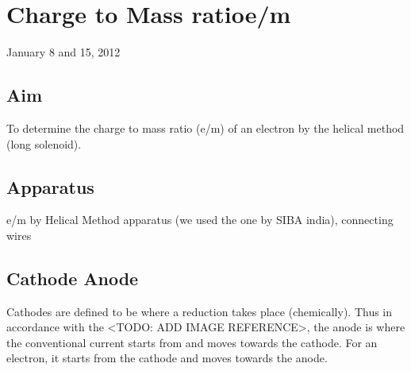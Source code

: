 \chapter{Charge to Mass ratioe/m}
\begin{flushright}
January 8 and 15, 2012
\end{flushright}
\section{Aim}
	To determine the charge to mass ratio (e/m) of an electron by the helical method (long solenoid).
\section{Apparatus}
	e/m by Helical Method apparatus (we used the one by SIBA india), connecting wires

\section{Cathode Anode}
	Cathodes are defined to be where a reduction takes place (chemically). Thus in accordance with the <TODO: ADD IMAGE REFERENCE>, the anode is where the conventional current starts from and moves towards the cathode. For an electron, it starts from the cathode and moves towards the anode.
